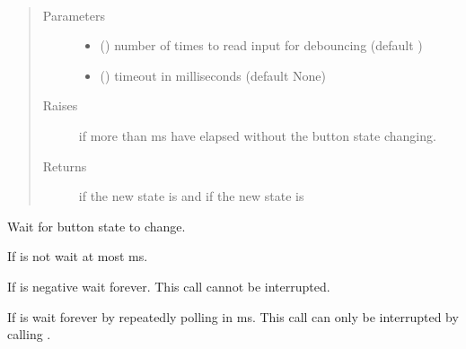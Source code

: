 \documentclass[letterpaper,10pt,english]{sphinxmanual}
\begin{document}
\begin{fulllineitems}
\begin{fulllineitems}
\end{fulllineitems}


\begin{fulllineitems}
\label{\detokenize{index:rcpy.button.Button.pressed}}~\begin{quote}\begin{description}
\item[{Parameters}] \leavevmode\begin{itemize}
\item {} 
 () \textendash{} number of times to read input for debouncing (default )

\item {} 
 () \textendash{} timeout in milliseconds (default None)

\end{itemize}

\item[{Raises}] \leavevmode
{\hyperref[\detokenize{index:rcpy.gpio.InputTimeout}]{}} \textendash{} if more than  ms have elapsed without the button state changing.

\item[{Returns}] \leavevmode
{} if the new state is {\hyperref[\detokenize{index:rcpy.button.PRESSED}]{}} and  if the new state is {\hyperref[\detokenize{index:rcpy.button.RELEASED}]{}}

\end{description}\end{quote}

Wait for button state to change.

If  is not  wait at most  ms.

If  is negative wait forever. This call cannot be interrupted.

If  is  wait forever by repeatedly polling in {\hyperref[\detokenize{index:rcpy.gpio.POLL_TIMEOUT}]{}} ms. This call can only be interrupted by calling {\hyperref[\detokenize{index:rcpy.exit}]{}}.


\end{fulllineitems}
\end{fulllineitems}
\end{document}
